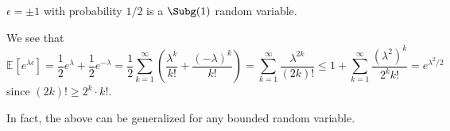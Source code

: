 \begin{eg}\label{eg:Rademacher-random-varaible}
	\(\epsilon = \pm 1\) with probability \(1 / 2\) is a \(\Subg(1) \) random variable.
\end{eg}
\begin{explanation}
	We see that
	\[
		\mathbb{E}_{}\left[e^{\lambda \epsilon } \right]
		= \frac{1}{2} e^\lambda + \frac{1}{2} e^{-\lambda }
		= \frac{1}{2} \sum_{k=1}^{\infty} \left( \frac{\lambda ^k}{k!} + \frac{(-\lambda )^k}{k!} \right)
		= \sum_{k=1}^{\infty} \frac{\lambda ^{2k}}{(2k)!}
		\leq 1 + \sum_{k=1}^{\infty} \frac{(\lambda ^2)^k}{2^k k!}
		= e^{\lambda ^2 / 2}
	\]
	since \((2k)! \geq 2^k \cdot k!\).
\end{explanation}

In fact, the above can be generalized for any bounded random variable.

